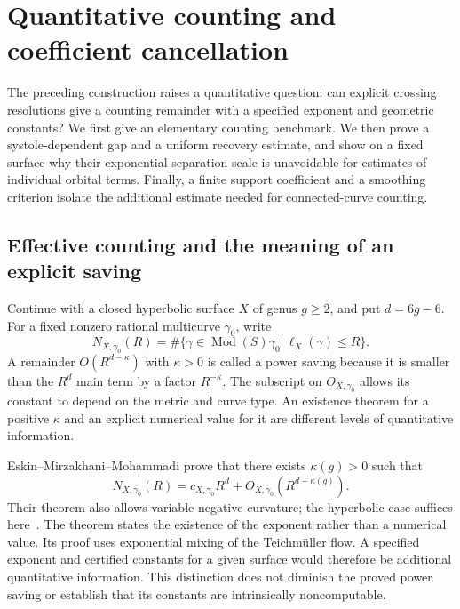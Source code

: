 \section{Quantitative counting and coefficient cancellation}
\label{sec:quantitativecounting}

The preceding construction raises a quantitative question: can explicit
crossing resolutions give a counting remainder with a specified exponent
and geometric constants? We first give an elementary counting benchmark.
We then prove a systole-dependent gap and a uniform recovery estimate,
and show on a fixed surface why their exponential separation scale is
unavoidable for estimates of individual orbital terms. Finally, a finite
support coefficient and a smoothing criterion isolate the additional
estimate needed for connected-curve counting.

\subsection{Effective counting and the meaning of an explicit saving}
\label{subsec:countknown}

Continue with a closed hyperbolic surface $X$ of genus $g\geq2$, and
put $d=6g-6$.  For a fixed nonzero rational multicurve $\gamma_0$, write
\[
 N_{X,\gamma_0}(R)=
 \#\{\gamma\in\operatorname{Mod}(S)\gamma_0:
                         \ell_X(\gamma)\leq R\}.
\]
A remainder $O(R^{d-\kappa})$ with $\kappa>0$ is called a
power saving because it is smaller than the $R^d$ main term
by a factor $R^{-\kappa}$. The subscript on $O_{X,\gamma_0}$
allows its constant to depend on the metric and curve type.
An existence theorem for a positive $\kappa$ and an explicit
numerical value for it are different levels of quantitative information.

Eskin--Mirzakhani--Mohammadi prove that there exists
$\kappa(g)>0$ such that
\begin{equation}
 N_{X,\gamma_0}(R)
 =c_{X,\gamma_0}R^d
   +O_{X,\gamma_0}(R^{d-\kappa(g)}).
 \label{eq:countEMM}
\end{equation}
Their theorem also allows variable negative curvature; the hyperbolic
case suffices here~\cite[Theorem 1.1]{EMMEffective}.  The theorem
states the existence of the exponent rather than a numerical value.
Its proof uses exponential mixing of the Teichm\"uller flow.  A
specified exponent and certified constants for a given surface would
therefore be additional quantitative information.  This distinction
does not diminish the proved power saving or establish that its
constants are intrinsically noncomputable.

